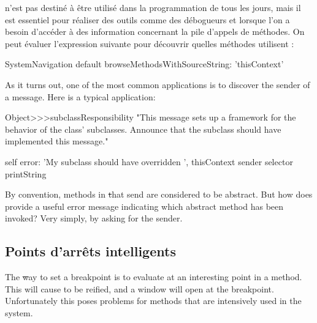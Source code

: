 \documentclass[a4paper,10pt,twoside]{book}
\begin{document}
 n'est pas destiné à être utilisé dans la programmation de tous les jours, mais il est essentiel pour réaliser des outils comme des débogueurs et lorsque l'on a besoin d'accéder à des information concernant la pile d'appels de méthodes.
On peut évaluer l'expression suivante pour découvrir quelles méthodes utilisent :

\begin{code}{}
SystemNavigation default browseMethodsWithSourceString: 'thisContext'
\end{code}

As it turns out, one of the most common applications is to discover the sender of a message.
Here is a typical application:
\begin{code}{}
Object>>>subclassResponsibility
	"This message sets up a framework for the behavior of the class' subclasses.
	Announce that the subclass should have implemented this message."

	self error: 'My subclass should have overridden ', thisContext sender selector printString
\end{code}

By convention, methods in \st that send  are considered to be abstract.  But how does  provide a useful error message indicating which abstract method has been invoked?  Very simply, by asking  for the sender.

\subsection{Points d'arrêts intelligents}

The \st way to set a breakpoint is to evaluate  at an interesting point in a method.  This will cause  to be reified, and a  window will open at the breakpoint.
Unfortunately this poses problems for methods that are intensively used in the system.
\end{document}
